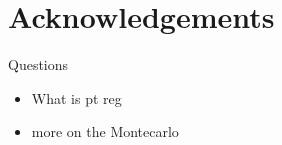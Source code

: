 \documentclass[11pt]{article}
\begin{document}
\newpage
{}
\tableofcontents
{}
\pagestyle{fancy}
\fancyhf{}
\fancyhead[L]{\rightmark}
\fancyfoot[C]{\thepage}
\setlength{\headheight}{13.59999pt}
\addtolength{\topmargin}{-1.59999pt}
\setlength{\headheight}{25.22153pt}
\addtolength{\topmargin}{-11.62154pt}

\newpage















\section*{Acknowledgements}
Questions
\begin{itemize}
    \item What is pt reg
    \item more on the Montecarlo 
\end{itemize}
\end{document}
